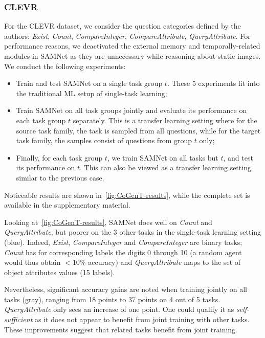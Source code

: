 \subsubsection{CLEVR}
\label{sec:reasoning-clevr}
For the CLEVR dataset, we consider the question categories defined by the authors: \textit{Exist}, \textit{Count}, \textit{CompareInteger}, \textit{CompareAttribute}, \textit{QueryAttribute}. For performance reasons, we deactivated the external memory and temporally-related modules in SAMNet as they are unnecessary while reasoning about static images. We conduct the following experiments:
\begin{itemize}
	\compresslist
	\item Train and test SAMNet on a single task group $t$. These 5 experiments fit into the traditional ML setup of single-task learning;
	\item Train SAMNet on all task groups jointly and evaluate its performance on each task group $t$ separately.
	This is a transfer learning setting where for the source task family, the task is sampled from all questions,
	while for the target task family, the samples consist of questions from group $t$ only;
	\item Finally, for each task group $t$, we train SAMNet on all tasks but $t$, and test its performance on $t$.
	This can also be viewed as a transfer learning setting similar to the previous case.
\end{itemize}

Noticeable results are shown in~\cref{fig:CoGenT-results}, while the complete set is available in the supplementary material.%


Looking at~\cref{fig:CoGenT-results}, SAMNet does well on \textit{Count} and \textit{QueryAttribute}, but poorer on the 3 other tasks in the single-task learning setting (blue). Indeed, \textit{Exist}, \textit{CompareInteger} and \textit{CompareInteger} are binary tasks; \textit{Count} has for corresponding labels the digits 0 through 10 (a random agent would thus obtain $<$10\% accuracy) and \textit{QueryAttribute} maps to the set of object attributes values (15 labels).

Nevertheless, significant accuracy gains are noted when training jointly on all tasks (gray), ranging from 18 points to 37 points on 4 out of 5 tasks. \textit{QueryAttribute} only sees an increase of one point. One could qualify it as \textit{self-sufficient} as it does not appear to benefit from joint training with other tasks. These improvements suggest that related tasks benefit from joint training.

